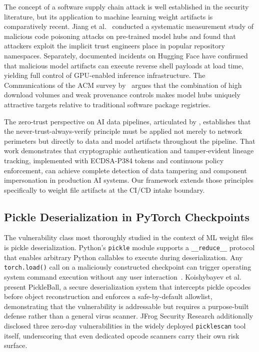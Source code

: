 \documentclass[sigconf,review]{acmart}
\begin{document}
The concept of a software supply chain attack is well established in the
security literature, but its application to machine learning weight artifacts
is comparatively recent. Jiang et al.~\cite{modelsarecodes2024} conducted
a systematic measurement study of malicious code poisoning attacks on
pre-trained model hubs and found that attackers exploit the implicit trust
engineers place in popular repository namespaces. Separately, documented
incidents on Hugging Face have confirmed that malicious model artifacts can
execute reverse shell payloads at load time, yielding full control of
GPU-enabled inference infrastructure. The Communications of the ACM survey
by~\citet{maliciousai2025} argues that the combination of high download
volumes and weak provenance controls makes model hubs uniquely attractive
targets relative to traditional software package registries.

The zero-trust perspective on AI data pipelines, articulated by
\citet{mudusu2026zerotrust}, establishes that the never-trust-always-verify
principle must be applied not merely to network perimeters but directly to
data and model artifacts throughout the pipeline. That work demonstrates
that cryptographic authentication and tamper-evident lineage tracking,
implemented with ECDSA-P384 tokens and continuous policy enforcement, can
achieve complete detection of data tampering and component impersonation in
production AI systems. Our framework extends those principles specifically
to weight file artifacts at the CI/CD intake boundary.

\subsection{Pickle Deserialization in PyTorch Checkpoints}

The vulnerability class most thoroughly studied in the context of ML weight
files is pickle deserialization. Python's \texttt{pickle} module supports a
\texttt{\_\_reduce\_\_} protocol that enables arbitrary Python callables to
execute during deserialization. Any \texttt{torch.load()} call on a
maliciously constructed checkpoint can trigger operating system command
execution without any user interaction~\cite{pickleball2025}. Koishybayev
et al.~\cite{pickleball2025} present PickleBall, a secure deserialization
system that intercepts pickle opcodes before object reconstruction and
enforces a safe-by-default allowlist, demonstrating that the vulnerability
is addressable but requires a purpose-built defense rather than a general
virus scanner. JFrog Security Research additionally disclosed three zero-day
vulnerabilities in the widely deployed \texttt{picklescan} tool itself,
underscoring that even dedicated opcode scanners carry their own risk
surface.
\end{document}
